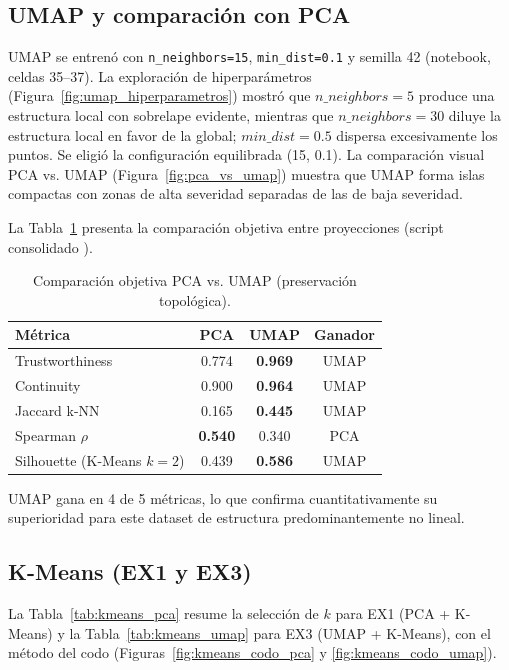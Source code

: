 \documentclass[11pt,a4paper]{article}
\begin{document}
\subsection{UMAP y comparación con PCA}

UMAP se entrenó con \texttt{n\_neighbors=15}, \texttt{min\_dist=0.1} y semilla 42 (notebook,
celdas 35--37). La exploración de hiperparámetros (Figura~\ref{fig:umap_hiperparametros})
mostró que $n\_neighbors=5$ produce una estructura local con sobrelape evidente, mientras que
$n\_neighbors=30$ diluye la estructura local en favor de la global; $min\_dist=0.5$ dispersa
excesivamente los puntos. Se eligió la configuración equilibrada (15, 0.1). La comparación
visual PCA vs. UMAP (Figura~\ref{fig:pca_vs_umap}) muestra que UMAP forma islas compactas con
zonas de alta severidad separadas de las de baja severidad.

La Tabla~\ref{tab:dim_metrics} presenta la comparación objetiva entre proyecciones
(script consolidado \cite{script}).

\begin{table}[H]
  \centering
  \caption{Comparación objetiva PCA vs. UMAP (preservación topológica).}
  \label{tab:dim_metrics}
  \begin{tabular}{@{}lccc@{}}
    \toprule
    \textbf{Métrica} & \textbf{PCA} & \textbf{UMAP} & \textbf{Ganador} \\
    \midrule
    Trustworthiness & 0.774 & \textbf{0.969} & UMAP \\
    Continuity & 0.900 & \textbf{0.964} & UMAP \\
    Jaccard k-NN & 0.165 & \textbf{0.445} & UMAP \\
    Spearman $\rho$ & \textbf{0.540} & 0.340 & PCA \\
    Silhouette (K-Means $k=2$) & 0.439 & \textbf{0.586} & UMAP \\
    \bottomrule
  \end{tabular}
\end{table}

UMAP gana en 4 de 5 métricas, lo que confirma cuantitativamente su superioridad para este
dataset de estructura predominantemente no lineal.

\subsection{K-Means (EX1 y EX3)}

La Tabla~\ref{tab:kmeans_pca} resume la selección de $k$ para EX1 (PCA + K-Means) y la
Tabla~\ref{tab:kmeans_umap} para EX3 (UMAP + K-Means), con el método del codo
(Figuras~\ref{fig:kmeans_codo_pca} y \ref{fig:kmeans_codo_umap}).
\end{document}
